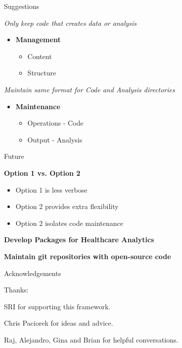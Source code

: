 \documentclass{beamer}
\begin{document}
\begin{frame}{Suggestions}

\emph{Only keep code that creates data or analysis}
\begin{itemize}

\item \textbf{Management}
\begin{itemize}
\item Content
\item Structure
\end{itemize}
\bigskip
\end{itemize}
\emph{ Maintain same format for  Code and Analysis directories}
\begin{itemize}
\item \textbf{Maintenance}
\begin{itemize}
\item Operations - Code
\item Output - Analysis
\end{itemize}

\end{itemize}

\end{frame}

\begin{frame}{Future}

\textbf{Option 1 vs. Option 2}
\begin{itemize}
\item Option 1 is less verbose
\item Option 2 provides extra flexibility
\item Option 2 isolates code maintenance
\end{itemize}
\bigskip

\textbf{Develop Packages for Healthcare Analytics}
\bigskip

\textbf{Maintain git repositories with open-source code}

\end{frame}

\begin{frame}{Acknowledgements}

Thanks:

\bigskip

SRI for supporting this framework.\\
\bigskip

Chris Paciorek for ideas and advice.\\
\bigskip

Raj, Alejandro, Gina and Brian for helpful conversations.\\
 
\end{frame}
\end{document}
